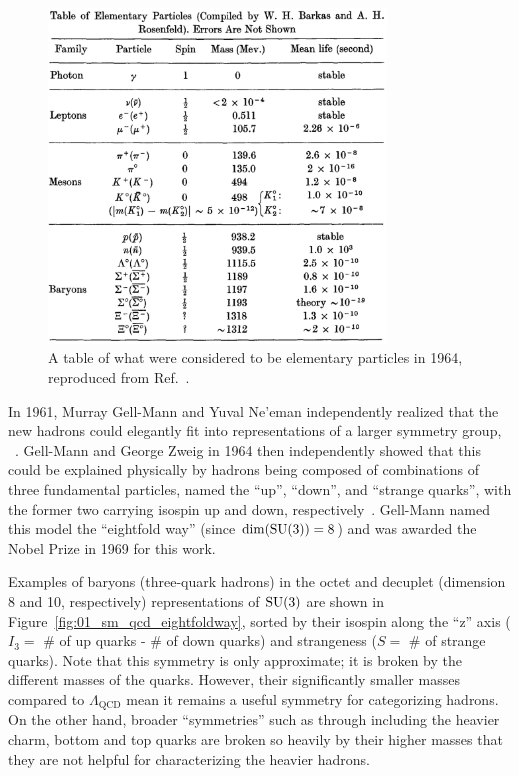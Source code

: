 \begin{figure}[ht]
	\centering
	\includegraphics[width=0.8\textwidth]{figures/01-SM-03-SM/qcd/table_elementary_particles_sakurai.png}
	\caption{A table of what were considered to be elementary particles in 1964, reproduced from Ref.~\cite{Sakurai:2015gmk}.}
	\label{fig:01_sm_qcd_particle_zoo}
\end{figure}

In 1961, Murray Gell-Mann and Yuval Ne'eman independently realized that the new hadrons could elegantly fit into representations of a larger symmetry group, \SU[3]~\cite{Gell-Mann:1961omu, Neeman:1961jhl}.
Gell-Mann and George Zweig in 1964 then independently showed that this could be explained physically by hadrons being composed of combinations of three fundamental particles, named the ``up'', ``down'', and ``strange quarks'', with the former two carrying isospin up and down, respectively~\cite{Gell-Mann:1964ewy, Zweig:1964jf}.
Gell-Mann named this model the ``eightfold way'' (since $\dim (\SU[3]) = 8$) and was awarded the Nobel Prize in 1969 for this work.

Examples of baryons (three-quark hadrons) in the octet and decuplet (dimension 8 and 10, respectively) representations of $\SU[3]$ are shown in Figure~\ref{fig:01_sm_qcd_eightfoldway}, sorted by their isospin along the ``z'' axis ($I_3 = $ \# of up quarks - \# of down quarks) and strangeness ($S = $ \# of strange quarks).
Note that this \SU[3] symmetry is only approximate; it is broken by the different masses of the quarks.
However, their significantly smaller masses compared to $\Lambda_{\mathrm{QCD}}$ mean it remains a useful symmetry for categorizing hadrons.
On the other hand, broader ``symmetries'' such as \SU[4] through \SU[6] including the heavier charm, bottom and top quarks are broken so heavily by their higher masses that they are not helpful for characterizing the heavier hadrons.

